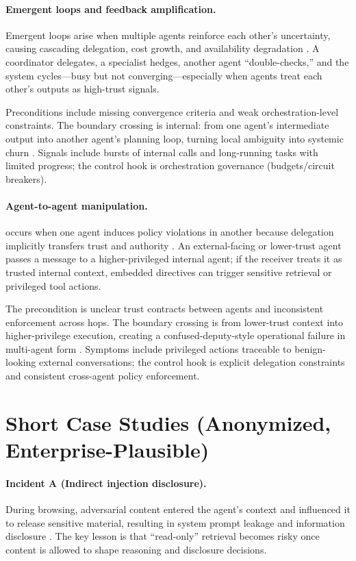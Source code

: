\begin{TNtwocol}
  \paragraph{Emergent loops and feedback amplification.} Emergent loops arise when multiple agents reinforce each other's uncertainty, causing cascading delegation, cost growth, and availability degradation \cite{owasp-top10-llm-2025,cisa-ztmm-v2}. A coordinator delegates, a specialist hedges, another agent “double-checks,” and the system cycles—busy but not converging—especially when agents treat each other's outputs as high-trust signals.

  Preconditions include missing convergence criteria and weak orchestration-level constraints. The boundary crossing is internal: from one agent's intermediate output into another agent's planning loop, turning local ambiguity into systemic churn \cite{owasp-top10-llm-2025,cisa-ztmm-v2}. Signals include bursts of internal calls and long-running tasks with limited progress; the control hook is orchestration governance (budgets/circuit breakers).

  \paragraph{Agent-to-agent manipulation.} occurs when one agent induces policy violations in another because delegation implicitly transfers trust and authority \cite{mitre-atlas,owasp-top10-llm-2025}. An external-facing or lower-trust agent passes a message to a higher-privileged internal agent; if the receiver treats it as trusted internal context, embedded directives can trigger sensitive retrieval or privileged tool actions.

  The precondition is unclear trust contracts between agents and inconsistent enforcement across hops. The boundary crossing is from lower-trust context into higher-privilege execution, creating a confused-deputy-style operational failure in multi-agent form \cite{mitre-atlas,owasp-top10-llm-2025}. Symptoms include privileged actions traceable to benign-looking external conversations; the control hook is explicit delegation constraints and consistent cross-agent policy enforcement.

  \section{Short Case Studies (Anonymized, Enterprise-Plausible)}

  \paragraph{Incident A (Indirect injection \rightarrow disclosure).} During browsing, adversarial content entered the agent's context and influenced it to release sensitive material, resulting in system prompt leakage and information disclosure \cite{owasp-top10-llm-2025,owasp-prompt-injection-cheatsheet}. The key lesson is that “read-only” retrieval becomes risky once content is allowed to shape reasoning and disclosure decisions.


\end{TNtwocol}
